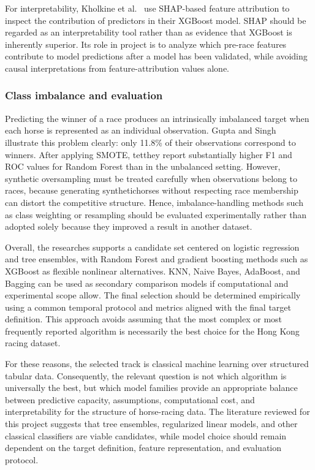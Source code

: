 For interpretability, Kholkine et al.~\cite{ejeB_kholkine2020} use SHAP-based
feature attribution to inspect the contribution of predictors in their XGBoost
model. SHAP should be regarded as an interpretability tool rather than as evidence
that XGBoost is inherently superior. Its role in project is to analyze which
pre-race features contribute to model predictions after a model has been validated,
while avoiding causal interpretations from feature-attribution values alone.

\subsubsection*{\textbf{Class imbalance and evaluation}} Predicting the winner of a race produces
an intrinsically imbalanced target when each horse is represented as an individual
observation. Gupta and Singh~\cite{ejeA_gupta2023} illustrate this problem clearly:
only 11.8\% of their observations correspond to winners. After applying SMOTE,
tetthey report substantially higher F1 and ROC values for Random Forest than in the
unbalanced setting. However, synthetic oversampling must be treated carefully when
observations belong to races, because generating synthetichorses without respecting
race membership can distort the competitive structure. Hence, imbalance-handling
methods such as class weighting or resampling should be evaluated experimentally
rather than adopted solely because they improved a result in another dataset.

Overall, the researches supports a candidate set centered on logistic regression
and tree ensembles, with Random Forest and gradient boosting methods such as XGBoost
as flexible nonlinear alternatives. KNN, Naive Bayes, AdaBoost, and Bagging can be
used as secondary comparison models if computational and experimental scope allow.
The final selection should be determined empirically using a common temporal
protocol and metrics aligned with the final target definition. This approach avoids
assuming that the most complex or most frequently reported algorithm is necessarily
the best choice for the Hong Kong racing dataset.

For these reasons, the selected track is classical machine learning over structured
tabular data. Consequently, the relevant question is not which algorithm is
universally the best, but which model families provide an appropriate balance
between predictive capacity, assumptions, computational cost, and interpretability
for the structure of horse-racing data. The literature reviewed for this project
suggests that tree ensembles, regularized linear models, and other classical
classifiers are viable candidates, while model choice should remain dependent on the
target definition, feature representation, and evaluation protocol.